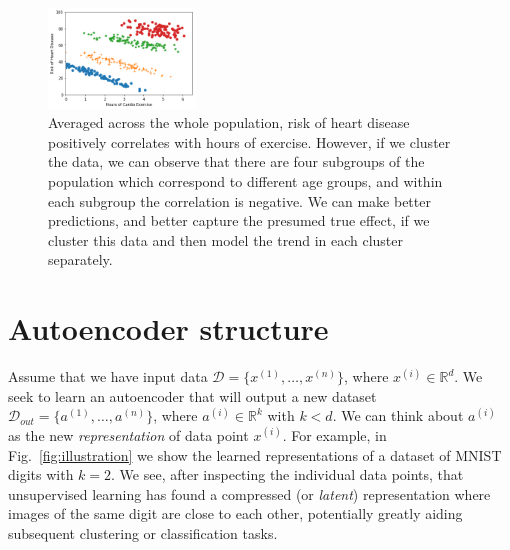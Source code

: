 \begin{figure}[h]
  \centering
  \includegraphics[width=0.35\textwidth]{figures/simpsons_color.png}
  \caption{Averaged across the whole population, risk of heart
    disease positively correlates with hours of exercise. However,
    if we cluster the data, we can observe that there are four
    subgroups of the population which correspond to different age
    groups, and within each subgroup the correlation is negative. We
    can make better predictions, and better capture the presumed
    true effect, if we cluster this data and then model the trend in
    each cluster separately.}
  \label{fig:simpsons_color}
\end{figure}










\section{Autoencoder structure}
\label{chap-autoencoders}
Assume that we have input data $\mathcal{D} = \{x^{(1)}, \ldots,
  x^{(n)} \}$, where $x^{(i)}\in \mathbb{R}^d$. We seek to learn an
autoencoder that will output a new dataset $\mathcal{D}_{out} =
  \{a^{(1)}, \ldots, a^{(n)}\}$, where $a^{(i)}\in \mathbb{R}^k$ with $k
  < d$. We can think about $a^{(i)}$ as the new \textit{representation}
of data point $x^{(i)}$. For example, in Fig.~\ref{fig:illustration}
we show the learned representations of a dataset of MNIST digits with
$k=2$. We see, after inspecting the individual data points, that
unsupervised learning has found a compressed (or {\em latent})
representation where images of the same digit are close to each
other, potentially greatly aiding subsequent clustering or
classification tasks.

